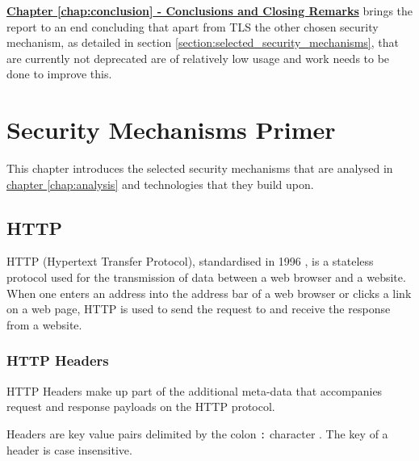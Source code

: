 \documentclass{mscreport}
\begin{document}
\vspace{0.3cm} \noindent
\hyperref[chap:conclusion]{\textbf{Chapter \ref{chap:conclusion} - Conclusions and Closing Remarks}} brings the report to an end concluding that apart from TLS the other chosen security mechanism, as detailed in section \ref{section:selected_security_mechanisms}, that are currently not deprecated are of relatively low usage and work needs to be done to improve this.

\newpage

%

\chapter{Security Mechanisms Primer}
\label{chap:sec_feat_primer}

This chapter introduces the selected security mechanisms that are analysed in \hyperref[chap:analysis]{chapter \ref{chap:analysis}} and technologies that they build upon.

\section{HTTP}
\label{section:http}

HTTP (Hypertext Transfer Protocol), standardised in 1996 \cite{Berners-Lee1996-ji}, is a stateless protocol used for the transmission of data between a web browser and a website. When one enters an address into the address bar of a web browser or clicks a link on a web page, HTTP is used to send the request to and receive the response from a website.

\subsection{HTTP Headers}

\noindent HTTP Headers make up part of the additional meta-data that accompanies request and response payloads on the HTTP protocol.

\vspace{0.3cm} \noindent
Headers are key value pairs delimited by the colon \texttt{:} character \cite{Berners-Lee1996-ji}. The key of a header is case insensitive.
\end{document}
